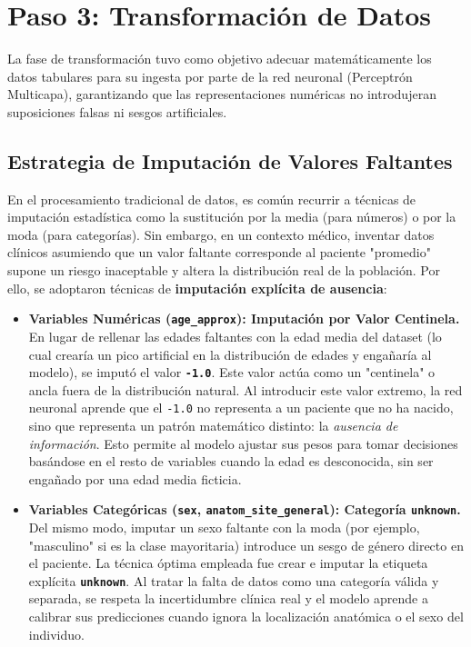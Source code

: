 \section{Paso 3: Transformación de Datos}

La fase de transformación tuvo como objetivo adecuar matemáticamente los datos tabulares para su ingesta por parte de la red neuronal (Perceptrón Multicapa), garantizando que las representaciones numéricas no introdujeran suposiciones falsas ni sesgos artificiales.

\subsection{Estrategia de Imputación de Valores Faltantes}
En el procesamiento tradicional de datos, es común recurrir a técnicas de imputación estadística como la sustitución por la media (para números) o por la moda (para categorías). Sin embargo, en un contexto médico, inventar datos clínicos asumiendo que un valor faltante corresponde al paciente "promedio" supone un riesgo inaceptable y altera la distribución real de la población. Por ello, se adoptaron técnicas de \textbf{imputación explícita de ausencia}:

\begin{itemize}
	\item \textbf{Variables Numéricas (\texttt{age\_approx}): Imputación por Valor Centinela.} \\
	En lugar de rellenar las edades faltantes con la edad media del dataset (lo cual crearía un pico artificial en la distribución de edades y engañaría al modelo), se imputó el valor \textbf{\texttt{-1.0}}. Este valor actúa como un "centinela" o ancla fuera de la distribución natural. Al introducir este valor extremo, la red neuronal aprende que el \texttt{-1.0} no representa a un paciente que no ha nacido, sino que representa un patrón matemático distinto: la \textit{ausencia de información}. Esto permite al modelo ajustar sus pesos para tomar decisiones basándose en el resto de variables cuando la edad es desconocida, sin ser engañado por una edad media ficticia.
	
	\item \textbf{Variables Categóricas (\texttt{sex}, \texttt{anatom\_site\_general}): Categoría \texttt{unknown}.} \\
	Del mismo modo, imputar un sexo faltante con la moda (por ejemplo, "masculino" si es la clase mayoritaria) introduce un sesgo de género directo en el paciente. La técnica óptima empleada fue crear e imputar la etiqueta explícita \textbf{\texttt{unknown}}. Al tratar la falta de datos como una categoría válida y separada, se respeta la incertidumbre clínica real y el modelo aprende a calibrar sus predicciones cuando ignora la localización anatómica o el sexo del individuo.
\end{itemize}

